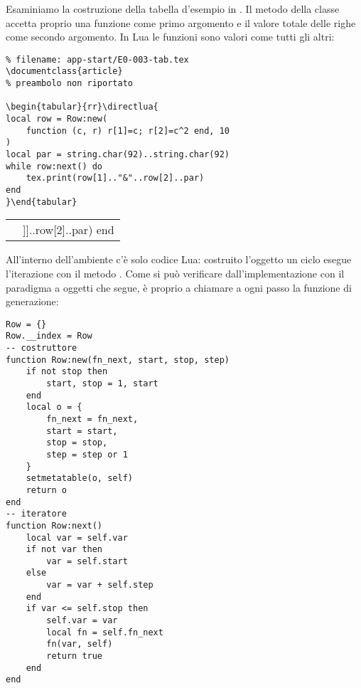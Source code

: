 Esaminiamo la costruzione della tabella d'esempio in \LuaLaTeX{}. Il metodo
 della classe  accetta proprio una funzione come primo
argomento e il valore totale delle righe come secondo argomento. In Lua le
funzioni sono valori come tutti gli altri:
\begin{tcolorbox}[sidebyside,righthand width=21mm]
\begin{Verbatim}[numbers=none,xleftmargin=0pt]
% !TeX program = LuaLaTeX
% filename: app-start/E0-003-tab.tex
\documentclass{article}
% preambolo non riportato

\begin{tabular}{rr}\directlua{
local row = Row:new(
    function (c, r) r[1]=c; r[2]=c^2 end, 10
)
local par = string.char(92)..string.char(92)
while row:next() do
    tex.print(row[1].."&"..row[2]..par)
end
}\end{tabular}

\end{Verbatim}
\tcblower
\begin{tabular}{rr}
\directlua{
local row = Row:new(function (c, r) r[1]=c; r[2] = c^2 end, 10)
local par = string.char(92)..string.char(92)
while row:next() do
    tex.print(row[1]..[[&]]..row[2]..par)
end
}
\end{tabular}
\end{tcolorbox}

All'interno dell'ambiente  c'è solo codice Lua: costruito l'oggetto
 un ciclo  esegue l'iterazione con il metodo . Come
si può verificare dall'implementazione con il paradigma a oggetti che segue, è
proprio  a chiamare a ogni passo la funzione di generazione:
%
%
%
\begin{Verbatim}
Row = {}
Row.__index = Row
-- costruttore
function Row:new(fn_next, start, stop, step)
    if not stop then
        start, stop = 1, start
    end
    local o = {
        fn_next = fn_next,
        start = start,
        stop = stop,
        step = step or 1
    }
    setmetatable(o, self)
    return o
end
-- iteratore
function Row:next()
    local var = self.var
    if not var then
        var = self.start
    else
        var = var + self.step
    end
    if var <= self.stop then
        self.var = var
        local fn = self.fn_next
        fn(var, self)
        return true
    end
end
\end{Verbatim}


